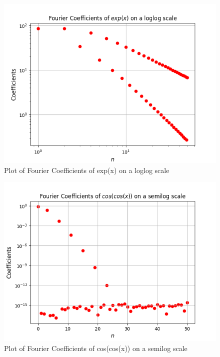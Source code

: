 \documentclass{article}
\begin{document}
\begin{figure}
    \centering
    \includegraphics[scale = 0.4]{Figure_4.png}
    \caption{Plot of Fourier Coefficients of exp(x) on a loglog scale}
    \label{fig:my_label}
\end{figure}

\begin{figure}
    \centering
    \includegraphics[scale = 0.4]{Figure_5.png}
    \caption{Plot of Fourier Coefficients of cos(cos(x)) on a semilog scale}
    \label{fig:my_label}
\end{figure}
\end{document}
